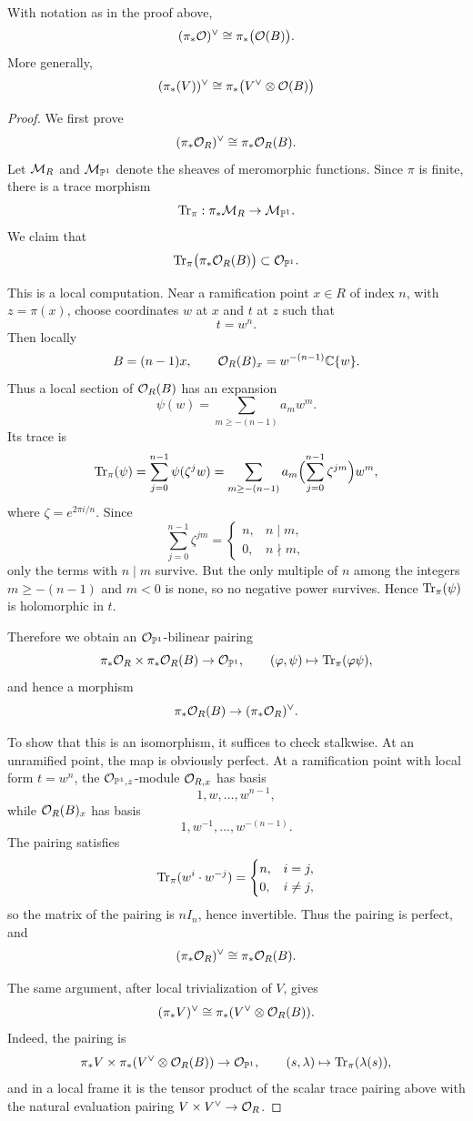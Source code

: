 \documentclass[12pt]{article}
\begin{document}
\begin{lemma}\label{lem:twisted-dual-direct-image}
With notation as in the proof above,
\[
(\pi_* {\mathcal{O}})^\vee \cong \pi_* \big({\mathcal{O}}(B)\big).
\]
More generally,
\[
(\pi_* (V))^\vee \cong \pi_* \bigl(V^\vee \otimes {\mathcal{O}}(B)\bigr)
\]
\end{lemma}\begin{proof}
We first prove
\[
(\pi_*{\mathcal{O}}_R)^\vee \cong \pi_*{\mathcal{O}}_R(B).
\]
Let \({\mathcal{M}}_R\) and \({\mathcal{M}}_{\mathbb{P}^1}\) denote the sheaves of meromorphic functions. Since
\(\pi\) is finite, there is a trace morphism
\[
\operatorname{Tr}_\pi:\pi_*{\mathcal{M}}_R \to {\mathcal{M}}_{\mathbb{P}^1}.
\]
We claim that
\[
\operatorname{Tr}_\pi\bigl(\pi_*{\mathcal{O}}_R(B)\bigr)\subset {\mathcal{O}}_{\mathbb{P}^1}.
\]

This is a local computation. Near a ramification point \(x\in R\) of index \(n\), with
\(z=\pi(x)\), choose coordinates \(w\) at \(x\) and \(t\) at \(z\) such that
\[
t=w^n.
\]
Then locally
\[
B=(n-1)x,
\qquad
{\mathcal{O}}_R(B)_x = w^{-(n-1)}\mathbb{C}\{w\}.
\]
Thus a local section of \({\mathcal{O}}_R(B)\) has an expansion
\[
\psi(w)=\sum_{m\ge -(n-1)} a_m w^m.
\]
Its trace is
\[
\operatorname{Tr}_\pi(\psi)=\sum_{j=0}^{n-1}\psi(\zeta^j w)
=\sum_{m\ge -(n-1)} a_m \Bigl(\sum_{j=0}^{n-1}\zeta^{jm}\Bigr) w^m,
\]
where \(\zeta=e^{2\pi i/n}\). Since
\[
\sum_{j=0}^{n-1}\zeta^{jm}=
\begin{cases}
n,& n\mid m,\\
0,& n\nmid m,
\end{cases}
\]
only the terms with \(n\mid m\) survive. But the only multiple of \(n\) among the integers
\(m\ge -(n-1)\) and \(m<0\) is none, so no negative power survives. Hence
\(\operatorname{Tr}_\pi(\psi)\) is holomorphic in \(t\).

Therefore we obtain an \({\mathcal{O}}_{\mathbb{P}^1}\)-bilinear pairing
\[
\pi_*{\mathcal{O}}_R \times \pi_*{\mathcal{O}}_R(B)\to {\mathcal{O}}_{\mathbb{P}^1},
\qquad
(\varphi,\psi)\mapsto \operatorname{Tr}_\pi(\varphi\psi),
\]
and hence a morphism
\[
\pi_*{\mathcal{O}}_R(B)\to (\pi_*{\mathcal{O}}_R)^\vee.
\]

To show that this is an isomorphism, it suffices to check stalkwise. At an unramified point,
the map is obviously perfect. At a ramification point with local form \(t=w^n\), the
\({\mathcal{O}}_{\mathbb{P}^1,z}\)-module \({\mathcal{O}}_{R,x}\) has basis
\[
1,w,\dots,w^{n-1},
\]
while \({\mathcal{O}}_R(B)_x\) has basis
\[
1,w^{-1},\dots,w^{-(n-1)}.
\]
The pairing satisfies
\[
\operatorname{Tr}_\pi(w^i\cdot w^{-j})=
\begin{cases}
n,& i=j,\\
0,& i\neq j,
\end{cases}
\]
so the matrix of the pairing is \(nI_n\), hence invertible. Thus the pairing is perfect, and
\[
(\pi_*{\mathcal{O}}_R)^\vee \cong \pi_*{\mathcal{O}}_R(B).
\]

The same argument, after local trivialization of \(V\), gives
\[
(\pi_*V)^\vee \cong \pi_*(V^\vee\otimes {\mathcal{O}}_R(B)).
\]
Indeed, the pairing is
\[
\pi_*V \times \pi_*(V^\vee\otimes {\mathcal{O}}_R(B))\to {\mathcal{O}}_{\mathbb{P}^1},
\qquad
(s,\lambda)\mapsto \operatorname{Tr}_\pi(\lambda(s)),
\]
and in a local frame it is the tensor product of the scalar trace pairing above with the natural
evaluation pairing \(V\times V^\vee\to {\mathcal{O}}_R\).
\end{proof}
\end{document}
